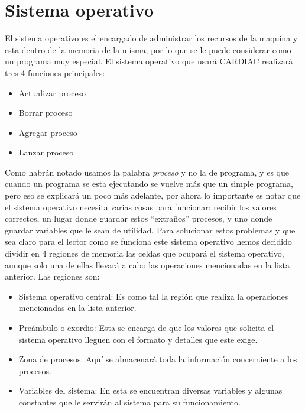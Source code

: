 \documentclass[12pt]{article}
\begin{document}
	
	\section{ Sistema operativo}
	
	El sistema operativo es el encargado de administrar los recursos de la maquina y esta dentro de la memoria de la misma, por lo
	que se le puede considerar como un programa muy especial. El sistema operativo que usará CARDIAC realizará tres 4 funciones
	principales:
	
	\begin{itemize}
		\item Actualizar proceso
		\item Borrar proceso
		\item Agregar proceso
		\item Lanzar proceso
	\end{itemize}
	
	Como habrán notado usamos la palabra \textit{proceso} y no la de programa, y es que cuando un programa se esta ejecutando
	se vuelve más que un simple programa, pero eso se explicará un poco más adelante, por ahora lo importante es notar que
	el sistema operativo necesita varias cosas para funcionar: recibir los valores correctos, un lugar donde
	guardar estos ``extraños'' procesos, y uno donde guardar variables que le sean de utilidad. Para solucionar estos
	problemas y que sea claro para el lector como se funciona este sistema operativo
	hemos decidido dividir en 4 regiones de memoria las celdas que ocupará el
	sistema operativo, aunque solo una de ellas llevará a cabo las operaciones mencionadas en la lista anterior. Las regiones
	son:
	
	\begin{itemize}
		\item Sistema operativo central: Es como tal la región que realiza la operaciones mencionadas en la lista anterior.
		\item Preámbulo o exordio: Esta se encarga de que los valores que solicita el sistema operativo lleguen con el
		formato y detalles que este exige.
		\item Zona de procesos: Aquí se almacenará toda la información concerniente a los procesos.
		\item Variables del sistema: En esta se encuentran diversas variables y algunas constantes que le servirán al sistema
		para su funcionamiento.
	\end{itemize}
	
\end{document}
